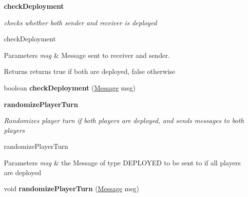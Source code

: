 \begin{Indent}{\bf check\+Deployment}\par
{\em checks whether both sender and receiver is deployed

check\+Deployment


\begin{DoxyParams}{Parameters}
{\em msg} & Message sent to receiver and sender. \\
\hline
\end{DoxyParams}
\begin{DoxyReturn}{Returns}
returns true if both are deployed, false otherwise 
\end{DoxyReturn}
}\begin{DoxyCompactItemize}
\item 
\hypertarget{classbattleship_1_1network_1_1Server_a3db26371134888d25e90b0df9fe1046a}{}boolean {\bfseries check\+Deployment} (\hyperlink{classbattleship_1_1game_1_1Message}{Message} msg)\label{classbattleship_1_1network_1_1Server_a3db26371134888d25e90b0df9fe1046a}

\end{DoxyCompactItemize}
\end{Indent}
\begin{Indent}{\bf randomize\+Player\+Turn}\par
{\em Randomizes player turn if both players are deployed, and sends messages to both players

randomize\+Player\+Turn


\begin{DoxyParams}{Parameters}
{\em msg} & the Message of type D\+E\+P\+L\+O\+Y\+E\+D to be sent to if all players are deployed \\
\hline
\end{DoxyParams}
}\begin{DoxyCompactItemize}
\item 
\hypertarget{classbattleship_1_1network_1_1Server_a528801be260464667d6f8f0f87e5661c}{}void {\bfseries randomize\+Player\+Turn} (\hyperlink{classbattleship_1_1game_1_1Message}{Message} msg)\label{classbattleship_1_1network_1_1Server_a528801be260464667d6f8f0f87e5661c}

\end{DoxyCompactItemize}
\end{Indent}
